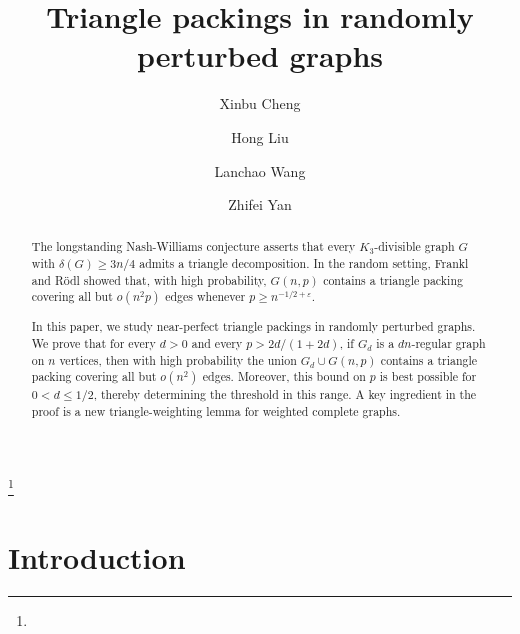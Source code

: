 \documentclass[11pt,reqno]{amsart}
\theoremstyle{definition}
\theoremstyle{remark}
\renewcommand\le{\leqslant}
\renewcommand\ge{\geqslant}
\begin{document}
\title{Triangle packings in randomly perturbed graphs}
\author{
Xinbu Cheng 
\and 
Hong Liu 
\and 
Lanchao Wang 
\and 
Zhifei Yan}

\address{IMPA, Estrada Dona Castorina 110, Jardim Bot\^anico,
Rio de Janeiro, 22460-320, Brazil}

\address{ECOPRO, Institute for Basic Science, 55 Expo-ro, Yuseong-gu, Daejeon, 34126, Korea}

\address{School of Mathematics, Nanjing University, Nanjing, China, and ECOPRO, Institute for Basic Science, 55 Expo-ro, Yuseong-gu, Daejeon, 44126, Korea}
	

\thanks{}

    
\begin{abstract}
The longstanding Nash-Williams conjecture asserts that every $K_3$-divisible graph $G$ with $\delta(G)\ge 3n/4$ admits a triangle decomposition. In the random setting, Frankl and R\"odl showed that, with high probability, $G(n,p)$ contains a triangle packing covering all but $o(n^2p)$ edges whenever $p\ge n^{-1/2+\varepsilon}$.

In this paper, we study near-perfect triangle packings in randomly perturbed graphs. We prove that for every $d>0$ and every $p>2d/(1+2d)$, if $G_d$ is a $dn$-regular graph on $n$ vertices, then with high probability the union $G_d\cup G(n,p)$ contains a triangle packing covering all but $o(n^2)$ edges. Moreover, this bound on $p$ is best possible for $0<d\le 1/2$, thereby determining the threshold in this range. A key ingredient in the proof is a new triangle-weighting lemma for weighted complete graphs.
\end{abstract}
	
	\maketitle

\section{Introduction}
\end{document}
